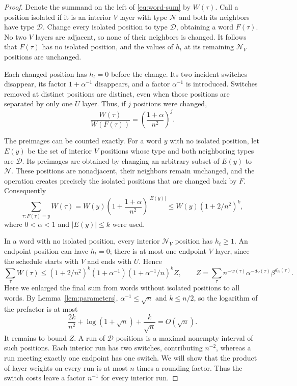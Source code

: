 \begin{proof}
Denote the summand on the left of \eqref{eq:word-sum} by $W(\tau)$.
Call a position isolated if it is an interior $V$ layer with type
$\mathcal N$ and both its neighbors have type $\mathcal D$. Change every
isolated position to type $\mathcal D$, obtaining a word $F(\tau)$.
No two $V$ layers are adjacent, so none of their neighbors is changed.
It follows that $F(\tau)$ has no isolated position, and the values of
$h_t$ at its remaining $\mathcal N_V$ positions are unchanged.

Each changed position has $h_t=0$ before the change. Its two incident
switches disappear, its factor $1+\alpha^{-1}$ disappears, and a factor
$\alpha^{-1}$ is introduced. Switches removed at distinct positions are
distinct, even when those positions are separated by only one $U$ layer.
Thus, if $j$ positions were changed,
\begin{equation}\label{eq:isolated-flip}
 \frac{W(\tau)}{W(F(\tau))}
 =\left(\frac{1+\alpha}{n^2}\right)^j.
\end{equation}

The preimages can be counted exactly. For a word $y$ with no isolated
position, let $E(y)$ be the set of interior $V$ positions whose type and
both neighboring types are $\mathcal D$. Its preimages are obtained by
changing an arbitrary subset of $E(y)$ to $\mathcal N$. These positions
are nonadjacent, their neighbors remain unchanged, and the operation
creates precisely the isolated positions that are changed back by $F$.
Consequently
\[
 \sum_{\tau:F(\tau)=y}W(\tau)
 =W(y)\left(1+\frac{1+\alpha}{n^2}\right)^{|E(y)|}
 \le W(y)(1+2/n^2)^k,
\]
where $0<\alpha<1$ and $|E(y)|\le k$ were used.

In a word with no isolated position, every interior $\mathcal N_V$
position has $h_t\ge1$. An endpoint position can have $h_t=0$; there is
at most one endpoint $V$ layer, since the schedule starts with $V$ and
ends with $U$. Hence
\begin{equation}\label{eq:correction-removal}
 \sum_\tau W(\tau)
 \le (1+2/n^2)^k(1+\alpha^{-1})
       (1+\alpha^{-1}/n)^k Z,
 \qquad
 Z=\sum_\tau n^{-w(\tau)}
                 \alpha^{-d_V(\tau)}\beta^{d_U(\tau)}.
\end{equation}
Here we enlarged the final sum from words without isolated positions to
all words. By Lemma~\ref{lem:parameters}, $\alpha^{-1}\le\sqrt n$ and
$k\le n/2$, so the logarithm of the prefactor is at most
\[
 \frac{2k}{n^2}+\log(1+\sqrt n)+\frac{k}{\sqrt n}
 =O(\sqrt n).
\]
It remains to bound $Z$. A run of $\mathcal D$ positions is a maximal
nonempty interval of such positions. Each interior run has two
switches, contributing $n^{-2}$, whereas a run meeting exactly one
endpoint has one switch. We will show that the product of layer
weights on every run is at most $n$ times a rounding factor. Thus the
switch costs leave a factor $n^{-1}$ for every interior run.


\end{proof}
